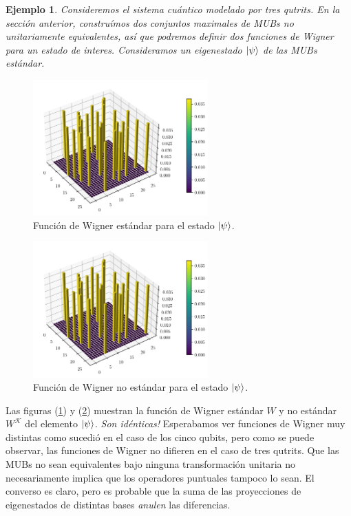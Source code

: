 \documentclass[a4paper]{report}
\newtheorem{example}{Ejemplo}
\begin{document}
  \clearpage
  \begin{example}
    Consideremos el sistema cuántico modelado por tres
    qutrits. En la sección anterior, construímos dos
    conjuntos maximales de MUBs no unitariamente
    equivalentes, así que podremos definir dos funciones de
    Wigner para un estado de interes. Consideramos un
    eigenestado $\ket{\psi}$  de las MUBs estándar.
  \end{example}
  \begin{figure}[ht]
    \centering
    \includegraphics[width=0.6\textwidth]{
    imgs/wigner-standard-3-3-s1.png}
    \caption{Función de Wigner estándar para el estado
    $\ket{\psi}$.}
    \label{fig:wigner-standard-3-3-s1}
  \end{figure}
  \begin{figure}[ht]
    \centering
    \includegraphics[width=0.6\textwidth]{
    imgs/wigner-standard-3-3-s1.png}
    \caption{Función de Wigner no estándar para el estado
    $\ket{\psi}$.}
    \label{fig:wigner-kantor-3-3-s1}
  \end{figure}
  Las figuras (\ref{fig:wigner-standard-3-3-s1}) y
  (\ref{fig:wigner-kantor-3-3-s1}) muestran la función de
  Wigner estándar $W$ y no estándar $W^{\mathcal K}$ del
  elemento $\ket{\psi}$. \textit{Son idénticas!} Esperabamos
  ver funciones de Wigner muy distintas como sucedió en el
  caso de los cinco qubits, pero como se puede observar, las
  funciones de Wigner no difieren en el caso de tres
  qutrits. Que las MUBs no sean equivalentes bajo ninguna
  transformación unitaria no necesariamente implica que los
  operadores puntuales tampoco lo sean.  El converso es
  claro, pero es probable que la suma de las proyecciones
  de eigenestados de distintas bases \textit{anulen} las
  diferencias. 
\end{document}
